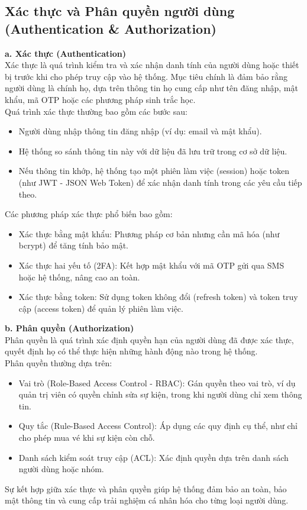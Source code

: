 \subsection{Xác thực và Phân quyền người dùng (Authentication \& Authorization)}
\indent \indent \textbf{a. Xác thực (Authentication)}\\
\indent Xác thực là quá trình kiểm tra và xác nhận danh tính của người dùng hoặc thiết bị trước khi cho phép truy cập vào hệ thống. Mục tiêu chính là đảm bảo rằng người dùng là chính họ, dựa trên thông tin họ cung cấp như tên đăng nhập, mật khẩu, mã OTP hoặc các phương pháp sinh trắc học. \\
\indent Quá trình xác thực thường bao gồm các bước sau:
\begin{itemize}
    \item[1.] Người dùng nhập thông tin đăng nhập (ví dụ: email và mật khẩu).
    \item[2.] Hệ thống so sánh thông tin này với dữ liệu đã lưu trữ trong cơ sở dữ liệu.
    \item[3.] Nếu thông tin khớp, hệ thống tạo một phiên làm việc (session) hoặc token (như JWT - JSON Web Token) để xác nhận danh tính trong các yêu cầu tiếp theo.
\end{itemize}
\indent \indent Các phương pháp xác thực phổ biến bao gồm:
\begin{itemize}
    \item[-] Xác thực bằng mật khẩu: Phương pháp cơ bản nhưng cần mã hóa (như bcrypt) để tăng tính bảo mật.
    \item[-] Xác thực hai yếu tố (2FA): Kết hợp mật khẩu với mã OTP gửi qua SMS hoặc hệ thống, nâng cao an toàn.
    \item[-] Xác thực bằng token: Sử dụng token không đổi (refresh token) và token truy cập (access token) để quản lý phiên làm việc.
\end{itemize}
\indent \indent \textbf{b. Phân quyền (Authorization)}\\
\indent Phân quyền là quá trình xác định quyền hạn của người dùng đã được xác thực, quyết định họ có thể thực hiện những hành động nào trong hệ thống. \\
\indent Phân quyền thường dựa trên:
\begin{itemize}
    \item[-] Vai trò (Role-Based Access Control - RBAC): Gán quyền theo vai trò, ví dụ quản trị viên có quyền chỉnh sửa sự kiện, trong khi người dùng chỉ xem thông tin.
    \item[-] Quy tắc (Rule-Based Access Control): Áp dụng các quy định cụ thể, như chỉ cho phép mua vé khi sự kiện còn chỗ.
    \item[-] Danh sách kiểm soát truy cập (ACL): Xác định quyền dựa trên danh sách người dùng hoặc nhóm.
\end{itemize}
\indent \indent Sự kết hợp giữa xác thực và phân quyền giúp hệ thống đảm bảo an toàn, bảo mật thông tin và cung cấp trải nghiệm cá nhân hóa cho từng loại người dùng.

